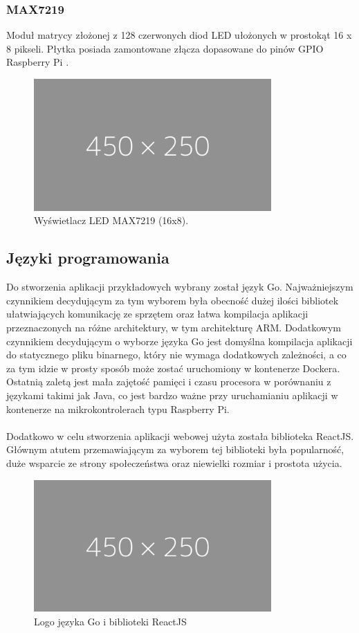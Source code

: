 \documentclass[12pt]{report}
\let\Oldsubsection\subsection
\renewcommand{\subsection}{\FloatBarrier\Oldsubsection}
\let\Oldsubsubsection\subsubsection
\renewcommand{\subsubsection}{\FloatBarrier\Oldsubsubsection}
\begin{document}
{\subsubsection{MAX7219}
Moduł matrycy złożonej z 128 czerwonych diod LED ułożonych w prostokąt 16 x 8 pikseli. Płytka posiada zamontowane złącza dopasowane do pinów GPIO Raspberry Pi \cite{MAX7219}. %
\begin{figure}[h]
	\centering
	\includegraphics[width=0.81\textwidth]{images/placeholder-wide.png}
	\caption{Wyświetlacz LED MAX7219 (16x8).}
\end{figure}
\subsection{Języki programowania}
Do stworzenia aplikacji przykładowych wybrany został język Go. Najważniejszym czynnikiem decydującym za tym wyborem była obecność dużej ilości bibliotek ułatwiających komunikację ze sprzętem oraz łatwa kompilacja aplikacji przeznaczonych na różne architektury, w tym architekturę ARM. Dodatkowym czynnikiem decydującym o wyborze języka Go jest domyślna kompilacja aplikacji do statycznego pliku binarnego, który nie wymaga dodatkowych zależności, a co za tym idzie w prosty sposób może zostać uruchomiony w kontenerze Dockera. Ostatnią zaletą jest mała zajętość pamięci i czasu procesora w porównaniu z językami takimi jak Java, co jest bardzo ważne przy uruchamianiu aplikacji w kontenerze na mikrokontrolerach typu Raspberry Pi.\\ \\
Dodatkowo w celu stworzenia aplikacji webowej użyta została biblioteka ReactJS. Głównym atutem przemawiającym za wyborem tej biblioteki była popularność, duże wsparcie ze strony społeczeństwa oraz niewielki rozmiar i prostota użycia.

\begin{figure}[h]
	\centering
	\includegraphics[width=0.81\textwidth]{images/placeholder-wide.png}
	\caption{Logo języka Go i biblioteki ReactJS}
\end{figure}

}
\end{document}
